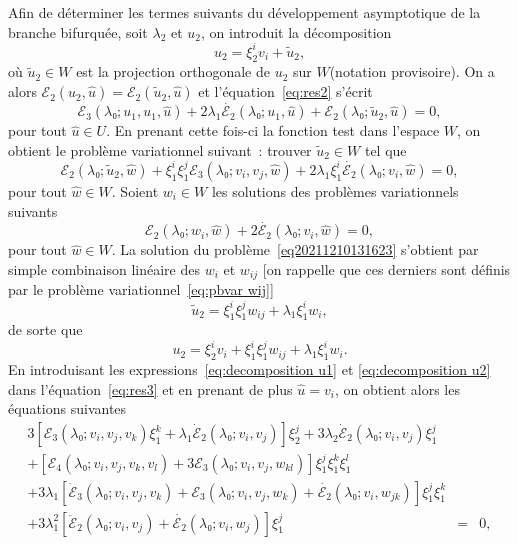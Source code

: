 \documentclass{article}
\begin{document}
Afin de déterminer les termes suivants du développement asymptotique
de la branche bifurquée, soit $λ_2$ et $u_2$, on introduit la
décomposition
\begin{equation}
  u_2 = ξ_2^i v_i + \tilde{u}_2,
\end{equation}
où $\tilde{u}_2∈W$ est la projection orthogonale de $u_2$ sur
$W$(notation provisoire). On a alors $ℰ_2 (u_2, \hat{u})
=ℰ_2 (\tilde{u}_2, \hat{u})$ et l'équation~\eqref{eq:res2}
s'écrit
\begin{equation}
  ℰ_3 (λ₀ ; u_1, u_1, \hat{u}) + 2 λ_1
  \dot{ℰ_2} (λ₀ ; u_1, \hat{u}) +ℰ_2 (λ₀ ;
  \tilde{u}_2, \hat{u}) = 0,
\end{equation}
pour tout $\hat{u}∈U$. En prenant cette fois-ci la fonction test dans
l'espace $W$, on obtient le problème variationnel suivant~: trouver
$\tilde{u}_2∈W$ tel que
\begin{equation}
  \label{eq20211210131623} ℰ_2 (λ₀ ; {\tilde{u}_2} , \hat{w})
  + ξ_1^i ξ_1^j ℰ_3 (λ₀ ; v_i, v_j, \hat{w}) + 2
  λ_1 ξ_1^i  \dot{ℰ_2} (λ₀ ; v_i, \hat{w}) = 0,
\end{equation}
pour tout $\hat{w}∈W$. Soient $w_i∈W$ les solutions des problèmes
variationnels suivants
\begin{equation}
  \label{eq:pbvar wi} ℰ_2 (λ₀ ; w_i, \hat{w}) + 2
  \dot{ℰ_2} (λ₀ ; v_i, \hat{w}) = 0,
\end{equation}
pour tout $\hat{w}∈W$. La solution du
problème~\eqref{eq20211210131623} s'obtient par simple combinaison
linéaire des $w_i$ et $w_{ij}$ [on rappelle que ces derniers sont
définis par le problème variationnel~\eqref{eq:pbvar wij}]
\begin{equation}
  \tilde{u}_2 = ξ_1^i ξ_1^j w_{i  j} + λ_1 ξ_1^i w_i,
\end{equation}
de sorte que
\begin{equation}
  \label{eq:decomposition u2} u_2 = ξ_2^i v_i + ξ_1^i ξ_1^j w_{i
   j} + λ_1 ξ_1^i w_i .
\end{equation}
En introduisant les expressions~\eqref{eq:decomposition u1} et
\eqref{eq:decomposition u2} dans l'équation~\eqref{eq:res3} et en prenant
de plus $\hat{u} = v_i$, on obtient alors les équations suivantes
\begin{eqnarray}
  3 [ℰ_3 (λ₀ ; v_i, v_j, v_k) ξ_1^k + λ_1
  \dot{ℰ}_2 (λ₀ ; v_i, v_j)] ξ_2^j + 3 λ_2
  \dot{ℰ}_2 (λ₀ ; v_i, v_j) ξ_1^j &  &  \nonumber\\
  + [ℰ_4 (λ₀ ; v_i, v_j, v_k, v_l) + 3ℰ_3
  (λ₀ ; v_i, v_j, w_{k  l})] ξ_1^j ξ_1^k ξ_1^l &  &
  \nonumber\\
  + 3 λ_1  [\dot{ℰ}_3 (λ₀ ; v_i, v_j, v_k)
  +ℰ_3 (λ₀ ; v_i, v_j, w_k) + \dot{ℰ_2} (λ₀
  ; v_i, w_{j  k})] ξ_1^j ξ_1^k &  &  \nonumber\\
  + 3 λ_1^2  [\ddot{ℰ}_2 (λ₀ ; v_i, v_j) +
  \dot{ℰ_2} (λ₀ ; v_i, w_j)] ξ_1^j & = & 0,
  \label{eq:bifurcation 2a}
\end{eqnarray}
\end{document}
